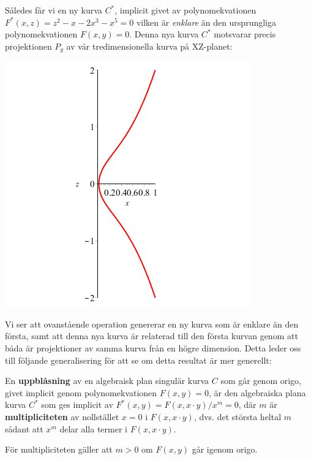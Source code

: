 Således får vi en ny kurva $C^*$, implicit givet av polynomekvationen $F^*(x,z)=z^2-x-2x^3-x^5=0$ vilken är \emph{enklare} än den ursprungliga polynomekvationen $F(x,y)=0$. Denna nya kurva $C^*$ motsvarar precis projektionen $P_y$ av vår tredimensionella kurva på XZ-planet:

\begin{center}
\includegraphics[scale=0.5]{Export/blowupex1_4.png}
\end{center}

Vi ser att ovanstående operation genererar en ny kurva som är enklare än den första, samt att denna nya kurva är relaterad till den första kurvan genom att båda är projektioner av samma kurva från en högre dimension. Detta leder oss till följande generalisering för att se om detta resultat är mer generellt:

\begin{Definition}
\label{BlowUp}
En \textbf{uppblåsning} av en algebraisk plan singulär kurva $C$ som går genom origo, givet implicit genom polynomekvationen $F(x,y)=0$, är den algebraiska plana kurva $C^*$ som ges implicit av $F^*(x,y) = F(x,x\cdot y)/x^m=0$, där $m$ är \textbf{multipliciteten} av nollstället $x=0$ i $F(x,x\cdot y)$, dvs. det största heltal $m$ sådant att $x^m$ delar alla termer i $F(x,x\cdot y)$.
\end{Definition}

\begin{Theorem}
\label{MultiplicityPositive}
För multipliciteten gäller att $m > 0$ om $F(x,y)$ går igenom origo.
\end{Theorem}

